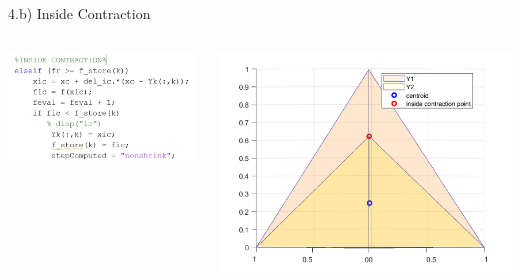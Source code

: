 \documentclass{beamer}
\begin{document}
\begin{frame}{4.b) Inside Contraction}
	\begin{columns}
	\begin{column}{0.39\linewidth}
		\centering
		\includegraphics[width=0.95\linewidth]{IC}
	\end{column}
	\begin{column}{0.59\linewidth}
		\centering
		\includegraphics[width=0.95\linewidth]{ICFig}
	\end{column}
	\end{columns}
\end{frame}
\end{document}
